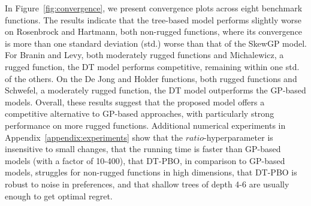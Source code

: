 \documentclass{article}
\begin{document}
In Figure~\ref{fig:convergence}, we present convergence plots across eight benchmark functions. The results indicate that the tree-based model performs slightly worse on Rosenbrock and Hartmann, both non-rugged functions, where its convergence is more than one standard deviation (std.) worse than that of the SkewGP model. For Branin and Levy, both moderately rugged functions and Michalewicz, a rugged function, the DT model performs competitive, remaining within one std. of the others. On the De Jong and Holder functions, both rugged functions and Schwefel, a moderately rugged function, the DT model outperforms the GP-based models. Overall, these results suggest that the proposed model offers a competitive alternative to GP-based approaches, with particularly strong performance on more rugged functions. Additional numerical experiments in Appendix~\ref{appendix:experiments} show that the $ratio$-hyperparameter is insensitive to small changes, that the running time is faster than GP-based models (with a factor of 10-400), that DT-PBO, in comparison to GP-based models, struggles for non-rugged functions in high dimensions, that DT-PBO is robust to noise in preferences, and that shallow trees of depth 4-6 are usually enough to get optimal regret.

\end{document}
